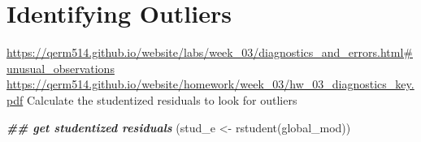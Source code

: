 \documentclass[
]{article}
\newenvironment{Shaded}{\begin{snugshade}}{\end{snugshade}}
\newcommand{\DocumentationTok}[1]{\textcolor[rgb]{0.56,0.35,0.01}{\textbf{\textit{#1}}}}
\newcommand{\FunctionTok}[1]{\textcolor[rgb]{0.00,0.00,0.00}{#1}}
\newcommand{\NormalTok}[1]{#1}
\newcommand{\OtherTok}[1]{\textcolor[rgb]{0.56,0.35,0.01}{#1}}
\begin{document}
\hypertarget{identifying-outliers}{%
\section{Identifying Outliers}\label{identifying-outliers}}

\url{https://qerm514.github.io/website/labs/week_03/diagnostics_and_errors.html\#unusual_observations}
\url{https://qerm514.github.io/website/homework/week_03/hw_03_diagnostics_key.pdf}
Calculate the studentized residuals to look for outliers

\begin{Shaded}
\begin{Highlighting}[]
\DocumentationTok{\#\# get studentized residuals}
\NormalTok{(stud\_e }\OtherTok{\textless{}{-}} \FunctionTok{rstudent}\NormalTok{(global\_mod))}
\end{Highlighting}
\end{Shaded}
\end{document}
